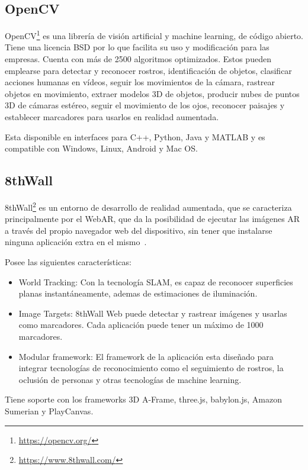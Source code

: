 \subsection{OpenCV}

OpenCV\footnote{\url{https://opencv.org/}} es una librería de visión artificial y machine learning, de código abierto. Tiene una licencia BSD por lo que facilita su uso y modificación para las empresas. Cuenta con más de 2500 algoritmos optimizados. Estos pueden emplearse para detectar y reconocer rostros, identificación de objetos, clasificar acciones humanas en vídeos, seguir los movimientos de la cámara, rastrear objetos en movimiento, extraer modelos 3D de objetos, producir nubes de puntos 3D de cámaras estéreo, seguir el movimiento de los ojos, reconocer paisajes y establecer marcadores para usarlos en realidad aumentada.

Esta disponible en interfaces para C++, Python, Java y MATLAB y es compatible con Windows, Linux, Android y Mac OS.


\subsection{8thWall}

8thWall\footnote{\url{https://www.8thwall.com/}}
es un entorno de desarrollo de realidad aumentada, que se caracteriza principalmente por el WebAR, que da la posibilidad de ejecutar las imágenes AR a través del propio navegador web del dispositivo, sin tener que instalarse ninguna aplicación extra en el mismo~\cite{8thwall_products}.

Posee las siguientes características:

\begin{itemize}
	\item World Tracking: Con la tecnología SLAM, es capaz de reconocer superficies planas instantáneamente, ademas de estimaciones de iluminación.
	\item Image Targets: 8thWall Web puede detectar y rastrear imágenes y usarlas como marcadores. Cada aplicación puede tener un máximo de 1000 marcadores.
	\item Modular framework: El framework de la aplicación esta diseñado para integrar tecnologías de reconocimiento como el seguimiento de rostros, la oclusión de personas y otras tecnologías de machine learning.
\end{itemize}


Tiene soporte con los frameworks 3D A-Frame, three.js, babylon.js, Amazon Sumerian y PlayCanvas.

